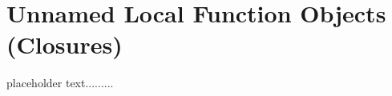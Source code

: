 \newpage
\section[Lambdas]{Unnamed Local Function Objects (Closures)}\label{lambda}


placeholder text.........


